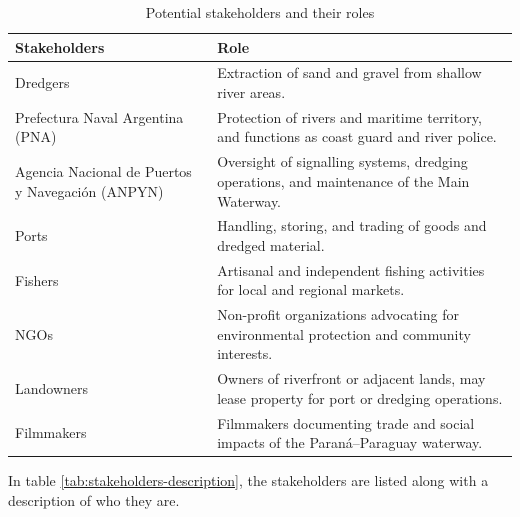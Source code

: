 \begin{table}[H]
\centering
\begin{tabularx}{\linewidth}{p{3.5cm}X} %
\toprule
Stakeholders & Role \\
\midrule
Dredgers & Extraction of sand and gravel from shallow river areas. \\
\midrule
Prefectura Naval Argentina (PNA) & Protection of rivers and maritime territory, and functions as coast guard and river police. \\
\midrule
Agencia Nacional de Puertos y Navegación (ANPYN) & Oversight of signalling systems, dredging operations, and maintenance of the Main Waterway. \\
\midrule
Ports & Handling, storing, and trading of goods and dredged material. \\
\midrule
Fishers & Artisanal and independent fishing activities for local and regional markets. \\
\midrule
NGOs & Non-profit organizations advocating for environmental protection and community interests. \\
\midrule
Landowners & Owners of riverfront or adjacent lands, may lease property for port or dredging operations. \\
\midrule
Filmmakers & Filmmakers documenting trade and social impacts of the Paraná–Paraguay waterway. \\
\bottomrule
\end{tabularx}
\caption{Potential stakeholders and their roles}
\label{tab:stakeholders}
\end{table}

\newpage

In table \ref{tab:stakeholders-description}, the stakeholders are listed along with a description of who they are.

